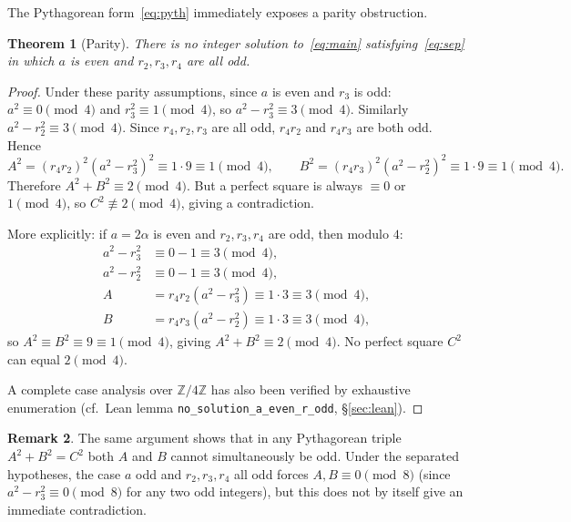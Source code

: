 \documentclass[12pt, a4paper]{article}
\newtheorem{theorem}{Theorem}[section]
\theoremstyle{definition}
\newtheorem{remark}[theorem]{Remark}
\begin{document}
The Pythagorean form~\eqref{eq:pyth} immediately exposes a parity obstruction.

\begin{theorem}[Parity]\label{thm:parity}
  There is no integer solution to~\eqref{eq:main} satisfying~\eqref{eq:sep} in
  which $a$ is even and $r_2, r_3, r_4$ are all odd.
\end{theorem}

\begin{proof}
  Under these parity assumptions, since $a$ is even and $r_3$ is odd:
  $a^2 \equiv 0 \pmod{4}$ and $r_3^2 \equiv 1 \pmod{4}$, so $a^2 - r_3^2 \equiv 3
  \pmod{4}$.  Similarly $a^2 - r_2^2 \equiv 3 \pmod{4}$.  Since $r_4, r_2, r_3$
  are all odd, $r_4 r_2$ and $r_4 r_3$ are both odd.  Hence
  \[
    A^2 = (r_4 r_2)^2(a^2-r_3^2)^2 \equiv 1\cdot 9 \equiv 1 \pmod{4},
    \qquad
    B^2 = (r_4 r_3)^2(a^2-r_2^2)^2 \equiv 1\cdot 9 \equiv 1 \pmod{4}.
  \]
  Therefore $A^2+B^2 \equiv 2 \pmod{4}$.  But a perfect square is always
  $\equiv 0$ or $1 \pmod{4}$, so $C^2 \not\equiv 2 \pmod{4}$, giving a
  contradiction.

  More explicitly: if $a = 2\alpha$ is even and $r_2, r_3, r_4$ are odd, then
  modulo $4$:
  \begin{align*}
    a^2 - r_3^2 &\equiv 0 - 1 \equiv 3 \pmod 4,\\
    a^2 - r_2^2 &\equiv 0 - 1 \equiv 3 \pmod 4,\\
    A &= r_4 r_2(a^2-r_3^2) \equiv 1\cdot 3 \equiv 3 \pmod 4,\\
    B &= r_4 r_3(a^2-r_2^2) \equiv 1\cdot 3 \equiv 3 \pmod 4,
  \end{align*}
  so $A^2 \equiv B^2 \equiv 9 \equiv 1 \pmod{4}$, giving $A^2+B^2 \equiv 2
  \pmod{4}$.  No perfect square $C^2$ can equal $2 \pmod{4}$.

  A complete case analysis over $\mathbb{Z}/4\mathbb{Z}$ has also been verified
  by exhaustive enumeration (cf.\ Lean lemma \texttt{no\_solution\_a\_even\_r\_odd},
  \S\ref{sec:lean}).
\end{proof}

\begin{remark}
  The same argument shows that in any Pythagorean triple $A^2+B^2=C^2$ both $A$
  and $B$ cannot simultaneously be odd.  Under the separated hypotheses, the
  case $a$ odd and $r_2, r_3, r_4$ all odd forces $A, B \equiv 0 \pmod{8}$
  (since $a^2-r_3^2 \equiv 0 \pmod{8}$ for any two odd integers), but this does
  not by itself give an immediate contradiction.
\end{remark}
\end{document}
